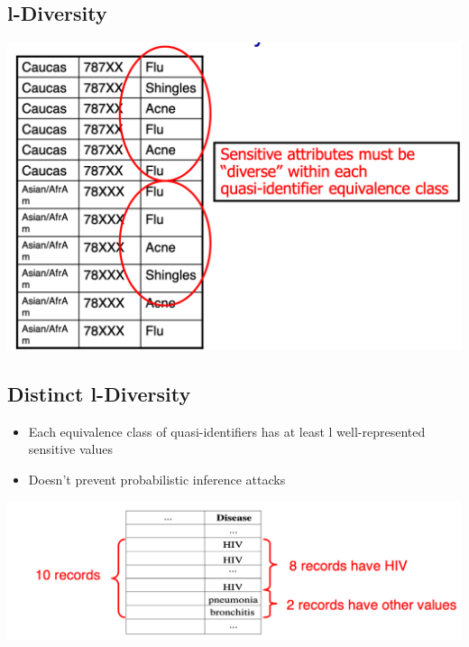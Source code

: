 \documentclass[11pt]{article}
\theoremstyle{definition}
\begin{document}
\subsection{l-Diversity}
\includegraphics[width=\textwidth/2]{22.png}

\subsection{Distinct l-Diversity}
\begin{itemize}
    \item Each equivalence class of quasi-identifiers has at
    least l well-represented sensitive values
    \item Doesn’t prevent probabilistic inference attacks
\end{itemize}
\includegraphics[width=\textwidth/2]{23.png}
\end{document}
